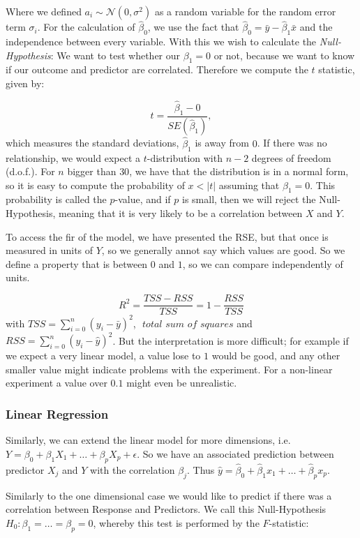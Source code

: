\documentclass{article}
\begin{document}
Where we defined $a_i \sim \mathcal{N}(0,\sigma^2)$ as a random variable for the random error term $\sigma_i$. For the calculation of $\hat{\beta}_0$, we use the fact that $\hat{\beta}_0 = \bar{y}-\hat{\beta}_1 \bar{x}$ and the independence between every variable.
With this we wish to calculate the \textit{Null-Hypothesis}:
We want to test whether our $\beta_1=0$ or not, because we want to know if our outcome and predictor are correlated. Therefore we compute the $t$ statistic, given by:

$$ t = \frac{\hat\beta_1-0}{SE(\hat\beta_1)}, $$
which measures the standard deviations, $\hat\beta_1$ is away from $0$. If there was no relationship, we would expect a $t$-distribution with $n-2$ degrees of freedom (d.o.f.). For $n$ bigger than $30$, we have that the distribution is in a normal form, so it is easy to compute the probability of $x<|t|$ assuming that $\beta_1=0$. This probability is called the $p$-value, and if $p$ is small, then we will reject the Null-Hypothesis, meaning that it is very likely to be a correlation between $X$ and $Y$.
\par


To access the fir of the model, we have presented the RSE, but that once is measured in units of $Y$, so we generally annot say which values are good. So we define a property that is between $0$ and $1$, so we can compare independently of units.

$$R^2 = \frac{TSS-RSS}{TSS} = 1-\frac{RSS}{TSS} $$
with $TSS = \sum_{i=0}^n (y_i-\bar y)^2$, $\textit{ total sum of squares}$ and  $RSS = \sum_{i=0}^n (y_i-\hat y)^2$. But the interpretation is more difficult; for example if we expect a very linear model, a value lose to $1$ would be good, and any other smaller value might indicate problems with the experiment. For a non-linear experiment a value over $0.1$ might even be unrealistic.


\subsubsection{Linear Regression}

Similarly, we can extend the linear model for more dimensions, i.e. $Y = \beta_0 + \beta_1 X_1 + \dots + \beta_pX_p+\epsilon$. So we have an associated prediction between predictor $X_j$ and $Y$ with the correlation $\beta_j$. Thus $\hat y = \hat\beta_0 + \hat\beta_1x_1 + \dots + \hat\beta_px_p$. \par

Similarly to the one dimensional case we would like to predict if there was a correlation between Response and Predictors. We call this Null-Hypothesis $H_0:\beta_1=\dots = \beta_p=0$, whereby this test is performed by the $F$-statistic:
\end{document}
